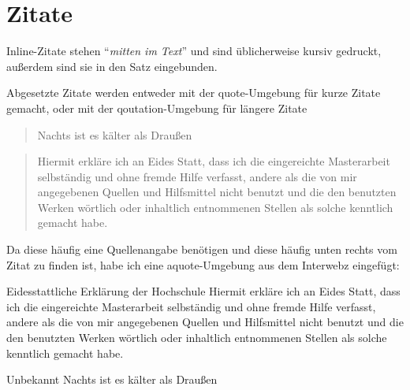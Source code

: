 \section{Zitate}

Inline-Zitate stehen \enquote{\emph{mitten im Text}} und sind üblicherweise kursiv gedruckt, außerdem sind sie in den Satz eingebunden.

Abgesetzte Zitate werden entweder mit der quote-Umgebung für kurze Zitate gemacht, oder mit der qoutation-Umgebung für längere Zitate

\begin{quote}
Nachts ist es kälter als Draußen
\end{quote}


\begin{quotation}
Hiermit erkläre ich an Eides Statt, dass ich die eingereichte Masterarbeit
				selbständig und ohne fremde Hilfe verfasst, andere als die von mir angegebenen Quellen
				und Hilfsmittel nicht benutzt und die den benutzten Werken wörtlich oder
				inhaltlich entnommenen Stellen als solche kenntlich gemacht habe. 
\end{quotation}

Da diese häufig eine Quellenangabe benötigen und diese häufig unten rechts vom Zitat zu finden ist, habe ich eine aquote-Umgebung aus dem Interwebz eingefügt:

\begin{aquote}{Eidesstattliche Erklärung der Hochschule}
Hiermit erkläre ich an Eides Statt, dass ich die eingereichte Masterarbeit
				selbständig und ohne fremde Hilfe verfasst, andere als die von mir angegebenen Quellen
				und Hilfsmittel nicht benutzt und die den benutzten Werken wörtlich oder
				inhaltlich entnommenen Stellen als solche kenntlich gemacht habe. 
\end{aquote}

\begin{aquote}{Unbekannt}
Nachts ist es kälter als Draußen
\end{aquote}
